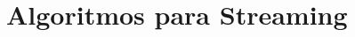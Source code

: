 \documentclass[../../document.tex]{subfiles}
\begin{document}
  \chapter{Algoritmos para Streaming}
\end{document}

